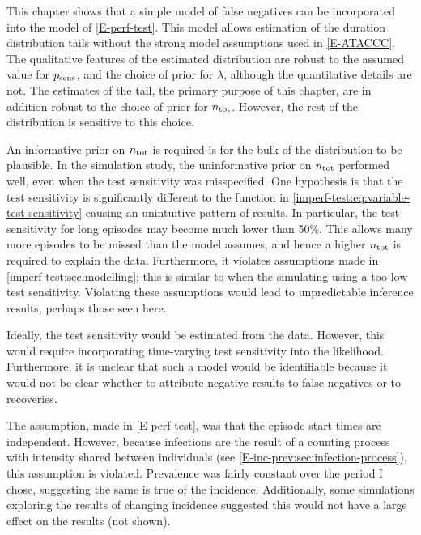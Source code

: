 \documentclass[thesis.tex]{subfiles}
\begin{document}
This chapter shows that a simple model of false negatives can be incorporated into the model of \cref{E-perf-test}.
This model allows estimation of the duration distribution tails without the strong model assumptions used in \cref{E-ATACCC}.
The qualitative features of the estimated distribution are robust to the assumed value for $p_\text{sens}$, and the choice of prior for $\lambda$, although the quantitative details are not.
The estimates of the tail, the primary purpose of this chapter, are in addition robust to the choice of prior for $n_\text{tot}$.
However, the rest of the distribution is sensitive to this choice.

An informative prior on $n_\text{tot}$ is required is for the bulk of the distribution to be plausible.
In the simulation study, the uninformative prior on $n_\text{tot}$ performed well, even when the test sensitivity was misspecified.
One hypothesis is that the test sensitivity is significantly different to the function in \cref{imperf-test:eq:variable-test-sensitivity} causing an unintuitive pattern of results.
In particular, the test sensitivity for long episodes may become much lower than 50\%.
This allows many more episodes to be missed than the model assumes, and hence a higher $n_\text{tot}$ is required to explain the data.
Furthermore, it violates assumptions made in \cref{imperf-test:sec:modelling}; this is similar to when the simulating using a too low test sensitivity.
Violating these assumptions would lead to unpredictable inference results, perhaps those seen here.

Ideally, the test sensitivity would be estimated from the data.
However, this would require incorporating time-varying test sensitivity into the likelihood.
Furthermore, it is unclear that such a model would be identifiable because it would not be clear whether to attribute negative results to false negatives or to recoveries.

The assumption, made in \cref{E-perf-test}, was that the episode start times are independent.
However, because infections are the result of a counting process with intensity shared between individuals (see \cref{E-inc-prev:sec:infection-process}), this assumption is violated.
Prevalence was fairly constant over the period I chose, suggesting the same is true of the incidence.
Additionally, some simulations exploring the results of changing incidence suggested this would not have a large effect on the results (not shown).

\end{document}
